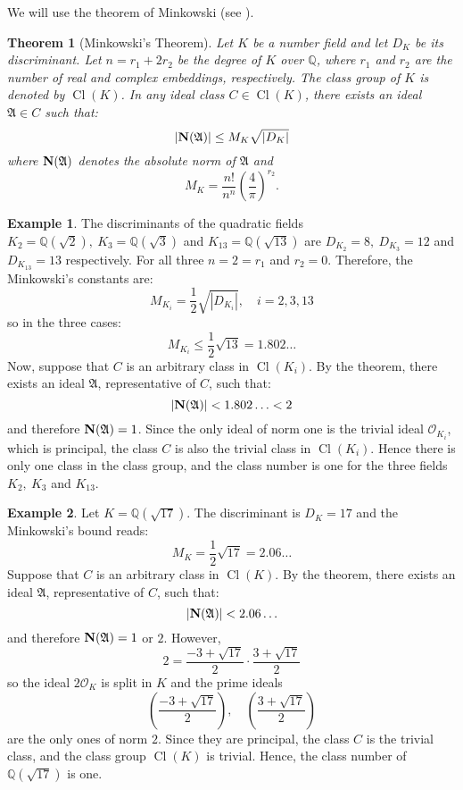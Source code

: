 \documentclass[12pt]{article}
\newtheorem*{thm}{Theorem}
\theoremstyle{definition}
\newtheorem{exa}{Example}
\newcommand{\Rats}{\mathbb{Q}}
\newcommand{\Cl}{\operatorname{Cl}}
\begin{document}
We will use the theorem of Minkowski (see ).

\begin{thm}[Minkowski's Theorem]
\label{thm1}
Let $K$ be a number field and let $D_K$ be its discriminant. Let $n=r_1+2r_2$ be the degree of $K$ over $\Rats$, where $r_1$ and $r_2$ are the number of real and complex embeddings, respectively. The class group of $K$ is denoted by $\Cl(K)$. In any ideal class $C\in \Cl(K)$, there exists an ideal $\mathfrak{A}\in C$ such that:
$$|{\bf N}(\mathfrak{A})| \leq M_K \sqrt{|D_K|}$$
where ${\bf N}(\mathfrak{A})$ denotes the absolute norm of $\mathfrak{A}$ and 
$$M_K=\frac{n!}{n^n} \left(\frac{4}{\pi}\right)^{r_2}.$$
\end{thm}

\begin{exa}
The discriminants of the quadratic fields $K_2=\Rats(\sqrt{2}),\ K_3=\Rats(\sqrt{3})$ and $K_{13}=\Rats(\sqrt{13})$ are $D_{K_2}=8,\ D_{K_3}=12$ and $D_{K_{13}}=13$ respectively. For all three $n=2=r_1$ and $r_2=0$. Therefore, the Minkowski's constants are:
$$M_{K_i}=\frac{1}{2}\sqrt{|D_{K_i}|},\quad i=2,3,13$$
so in the three cases:
$$M_{K_i}\leq \frac{1}{2}\sqrt{13}=1.802\ldots$$
Now, suppose that $C$ is an arbitrary class in $\Cl(K_i)$. By the theorem, there exists an ideal $\mathfrak{A}$, representative of $C$, such that:
$$|{\bf N}(\mathfrak{A})|<1.802\ldots <2$$ 
and therefore ${\bf N}(\mathfrak{A})=1$. Since the only ideal of norm one is the trivial ideal $\mathcal{O}_{K_i}$, which is principal, the class $C$ is also the trivial class in $\Cl(K_i)$. Hence there is only one class in the class group, and the class number is one for the three fields $K_2,\ K_3$ and $K_{13}$.\\
\end{exa}

\begin{exa}
Let $K=\Rats(\sqrt{17})$. The discriminant is $D_K=17$ and the Minkowski's bound reads:
$$M_K=\frac{1}{2}\sqrt{17}=2.06\ldots$$
Suppose that $C$ is an arbitrary class in $\Cl(K)$. By the theorem, there exists an ideal $\mathfrak{A}$, representative of $C$, such that:
$$|{\bf N}(\mathfrak{A})|<2.06\ldots$$ 
and therefore ${\bf N}(\mathfrak{A})=1$ or $2$. However,
$$2=\frac{-3+\sqrt{17}}{2}\cdot \frac{3+\sqrt{17}}{2}$$
so the ideal $2\mathcal{O}_K$ is split in $K$ and the prime ideals 
$$\left(\frac{-3+\sqrt{17}}{2} \right), \quad \left( \frac{3+\sqrt{17}}{2}\right)$$
are the only ones of norm $2$. Since they are principal, the class $C$ is the trivial class, and the class group $\Cl(K)$ is trivial. Hence, the class number of $\Rats(\sqrt{17})$ is one.
\end{exa}
\end{document}
